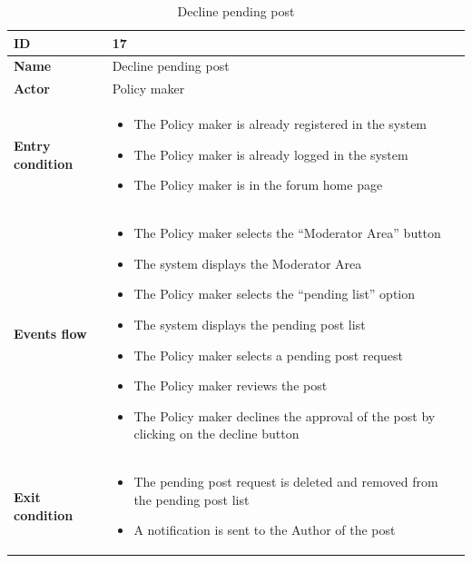     \begin{longtable}{p{} | p{}}
     \caption{Decline pending post}
    \label{tab:decline_pending_post}\\
        \hline
        \textbf{ID} & 17\\
        \hline
        \textbf{Name}  &  Decline pending post\\
        \hline
        \textbf{Actor}  &  Policy maker\\
        \hline
        \textbf{Entry condition}  &  \begin{itemize}
            \item The Policy maker is already registered in the system
            \item The Policy maker is already logged in the system
            \item The Policy maker is in the forum home page

        \end{itemize}\\
        \hline
        \textbf{Events flow} & \begin{itemize}
                \item The Policy maker selects the “Moderator Area” button
                \item The system displays the Moderator Area
                \item The Policy maker selects the “pending list” option 
                \item The system displays the pending post list
                \item The Policy maker selects a pending post request
                \item The Policy maker reviews the post
                \item The Policy maker declines the approval of the post by clicking on the decline button
                \end{itemize}
                 \\
        \hline
        \textbf{Exit condition} & \begin{itemize}
            \item The pending post request is deleted and removed from the pending post list
            \item A notification is sent to the Author of the post
        \end{itemize}\\
        \hline
   
    \end{longtable}

